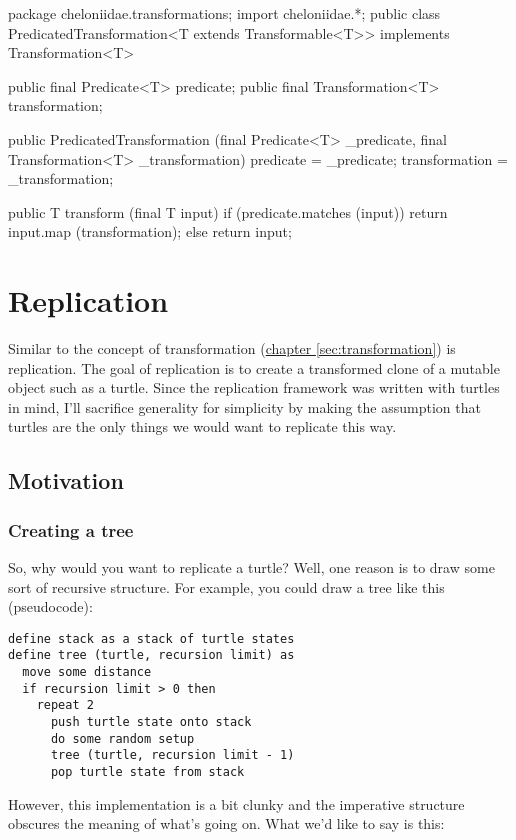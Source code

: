 \documentclass{report}
\newcommand{\Ref}[2]{\hyperref[#2]{#1 \ref*{#2}}}
\begin{document}
\begin{javacode}
package cheloniidae.transformations;
import cheloniidae.*;
public class PredicatedTransformation<T extends Transformable<T>> implements Transformation<T> {
  public final Predicate<T>      predicate;
  public final Transformation<T> transformation;

  public PredicatedTransformation (final Predicate<T> _predicate, final Transformation<T> _transformation)
    {predicate = _predicate; transformation = _transformation;}

  public T transform (final T input) {
    if (predicate.matches (input)) return input.map (transformation);
    else                           return input;
  }
}
\end{javacode}

\chapter {Replication} \label{sec:replication}
    Similar to the concept of transformation (\Ref{chapter}{sec:transformation}) is replication. The goal of replication is to create a transformed clone of a
    mutable object such as a turtle. Since the replication framework was written with turtles in mind, I'll sacrifice generality for simplicity by making the
    assumption that turtles are the only things we would want to replicate this way.

\section {Motivation} \label{sec:motivation}
\subsection {Creating a tree} \label{sec:creating-a-tree}
        So, why would you want to replicate a turtle? Well, one reason is to draw some sort of recursive structure. For example, you could draw a tree like this
        (pseudocode):

\begin{verbatim}
define stack as a stack of turtle states
define tree (turtle, recursion limit) as
  move some distance
  if recursion limit > 0 then
    repeat 2
      push turtle state onto stack
      do some random setup
      tree (turtle, recursion limit - 1)
      pop turtle state from stack
\end{verbatim}

        However, this implementation is a bit clunky and the imperative structure obscures the meaning of what's going on. What we'd like to say is this:
\end{document}
